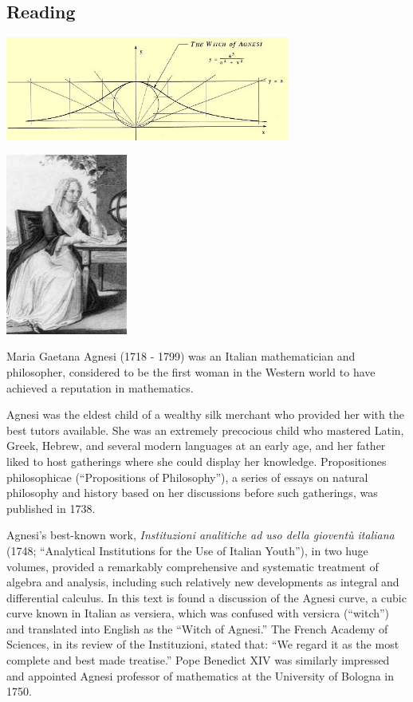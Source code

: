 


\subsection*{Reading}
\begin{center}
  \includegraphics[width=0.7\textwidth]{agnesi-curve}

  \vspace{2mm}
  \includegraphics[width=0.3\textwidth]{agnesi}
\end{center}

Maria Gaetana Agnesi (1718 - 1799) was an Italian mathematician and philosopher, considered to be the first woman in the Western world to have achieved a reputation in mathematics.

Agnesi was the eldest child of a wealthy silk merchant who provided her with the best tutors available. She was an extremely precocious child who mastered Latin, Greek, Hebrew, and several modern languages at an early age, and her father liked to host gatherings where she could display her knowledge. Propositiones philosophicae (“Propositions of Philosophy”), a series of essays on natural philosophy and history based on her discussions before such gatherings, was published in 1738.

Agnesi’s best-known work, \textit{Instituzioni analitiche ad uso della gioventù italiana} (1748; “Analytical Institutions for the Use of Italian Youth”), in two huge volumes, provided a remarkably comprehensive and systematic treatment of algebra and analysis, including such relatively new developments as integral and differential calculus. In this text is found a discussion of the Agnesi curve, a cubic curve known in Italian as versiera, which was confused with versicra (“witch”) and translated into English as the “Witch of Agnesi.” The French Academy of Sciences, in its review of the Instituzioni, stated that: “We regard it as the most complete and best made treatise.” Pope Benedict XIV was similarly impressed and appointed Agnesi professor of mathematics at the University of Bologna in 1750.

